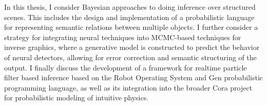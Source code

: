 

In this thesis, I consider Bayesian approaches to doing inference over
structured scenes. This includes the design and implementation of a
probabilistic language for representing semantic relations between multiple
objects. I further consider a strategy for integrating neural techniques into
MCMC-based techniques for inverse graphics, where a generative model is
constructed to predict the behavior of neural detectors, allowing for error
correction and semantic structuring of the output. I finally discuss the
development of a framework for realtime particle filter based inference based
on the Robot Operating System and Gen probabilistic programming language, as
well as its integration into the broader Cora project for probabilistic
modeling of intuitive physics.
